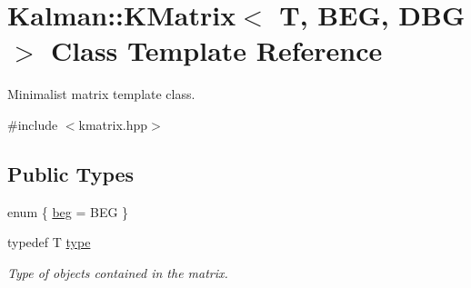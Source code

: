 \hypertarget{classKalman_1_1KMatrix}{}\section{Kalman\+:\+:K\+Matrix$<$ T, B\+EG, D\+BG $>$ Class Template Reference}
\label{classKalman_1_1KMatrix}


Minimalist matrix template class.  




{\ttfamily \#include $<$kmatrix.\+hpp$>$}

\subsection*{Public Types}
\begin{DoxyCompactItemize}
\item 
enum \{ \mbox{\hyperlink{classKalman_1_1KMatrix_a15a7efc1ab21c4f96c5cad6cd8349339a59bda0c9d147b1f66955188d5586994f}{beg}} = B\+EG
 \}
\item 
\mbox{\label{classKalman_1_1KMatrix_ad8e984029d2f56259c6cc053e23b4653}} 
typedef T \mbox{\hyperlink{classKalman_1_1KMatrix_ad8e984029d2f56259c6cc053e23b4653}{type}}
\begin{DoxyCompactList}\small\item\em Type of objects contained in the matrix. \end{DoxyCompactList}\end{DoxyCompactItemize}
